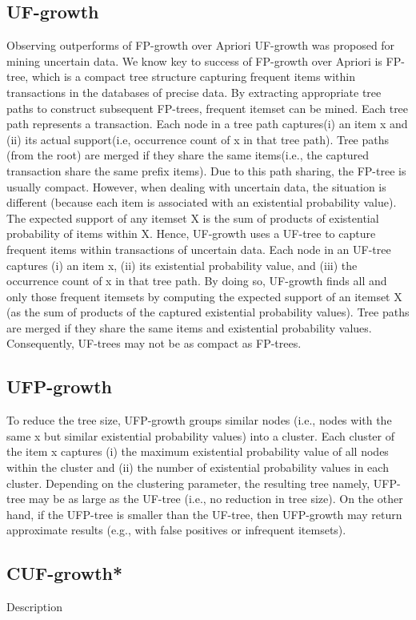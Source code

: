 \documentclass[a4paper,12pt]{book}
\begin{document}
\subsection{UF-growth}
Observing outperforms of FP-growth over Apriori UF-growth was proposed for mining uncertain data. We know key to success of FP-growth over Apriori is FP-tree, which is a compact tree structure capturing frequent items within transactions in the databases of precise data. By extracting appropriate tree paths to construct subsequent FP-trees, frequent itemset can be mined. Each tree path represents a transaction. Each node in a tree path captures(i) an item x and (ii) its actual support(i.e, occurrence count of x in that tree path). Tree paths (from the root) are merged if they share the same items(i.e., the captured transaction share the same prefix items). Due to this path sharing, the FP-tree is usually compact. However, when dealing with uncertain data, the situation is different (because each item is associated with an existential probability value). The expected support of any itemset X is the sum of products of existential probability of items within X. Hence, UF-growth uses a UF-tree to capture frequent items within transactions of uncertain data. Each node in an UF-tree captures (i) an item x, (ii) its existential probability value, and (iii) the occurrence count of x in that tree path. By doing so, UF-growth ﬁnds all and only those frequent itemsets by computing the expected support of an itemset X (as the sum of products of the captured existential probability values). Tree paths are merged if they share the same items and existential probability values. Consequently, UF-trees may not be as compact as FP-trees.

\subsection{UFP-growth}
To reduce the tree size, UFP-growth groups similar nodes (i.e., nodes with the same x but similar existential probability values) into a cluster. Each cluster of the item x captures (i) the maximum existential probability value of all nodes within the cluster and (ii) the number of existential probability values in each cluster. Depending on the clustering parameter, the resulting tree namely, UFP-tree may be as large as the UF-tree (i.e., no reduction in tree size). On the other hand, if the UFP-tree  is smaller than the UF-tree, then UFP-growth may return approximate results (e.g., with false positives or infrequent itemsets).
\subsection{CUF-growth*}
Description
\end{document}
